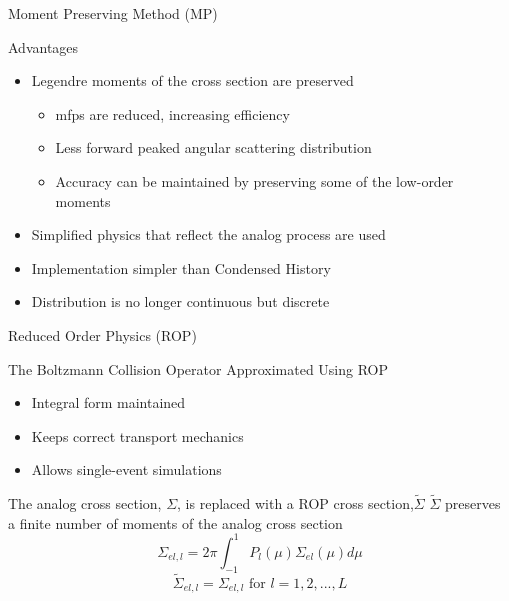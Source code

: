 \documentclass{beamer}
\begin{document}
  \begin{frame}{Moment Preserving Method (MP)}

  \begin{block}{Advantages}
    \begin{itemize}
      \item Legendre moments of the cross section are preserved
          \begin{itemize}
      \item mfps are reduced, increasing efficiency
      \item Less forward peaked angular scattering distribution
      \item Accuracy can be maintained by preserving some of the low-order moments
    \end{itemize}    
    
      \item Simplified physics that reflect the analog process are used
      \item Implementation simpler than Condensed History
      \item Distribution is no longer continuous but discrete

    \end{itemize}
  \end{block}


\end{frame}

  
  \begin{frame}{Reduced Order Physics (ROP)}

  \begin{block}{The Boltzmann Collision Operator Approximated Using ROP}
    \begin{itemize}
      \item Integral form maintained
      \item Keeps correct transport mechanics
      \item Allows single-event simulations
    \end{itemize}    
      \end{block}
    
      \begin{block}{The analog cross section, $\Sigma$, is replaced with a ROP cross section,$\tilde{\Sigma}$ }
      $\tilde{\Sigma}$ preserves a finite number of moments of the analog cross section
      $$ \Sigma_{el,l}=2\pi\int_{-1}^{1}P_l(\mu)\Sigma_{el}(\mu)d\mu$$
      $$\tilde{\Sigma}_{el,l}=\Sigma_{el,l}  \text{   for  } l=1,2,..., L$$ 

  \end{block}


\end{frame}
\end{document}
